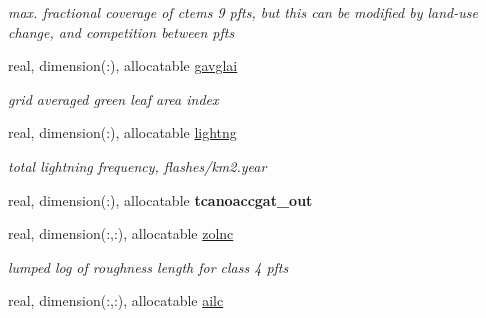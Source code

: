 \begin{DoxyCompactItemize}
\begin{DoxyCompactList}\small\item\em max. fractional coverage of ctem\textquotesingle{}s 9 pfts, but this can be modified by land-\/use change, and competition between pfts \end{DoxyCompactList}\item 
\hypertarget{structctem__statevars_1_1veg__gat_ac1dd257ff4997aaa914c15bde7110ce9}{}real, dimension(\+:), allocatable \hyperlink{structctem__statevars_1_1veg__gat_ac1dd257ff4997aaa914c15bde7110ce9}{gavglai}\label{structctem__statevars_1_1veg__gat_ac1dd257ff4997aaa914c15bde7110ce9}

\begin{DoxyCompactList}\small\item\em grid averaged green leaf area index \end{DoxyCompactList}\item 
\hypertarget{structctem__statevars_1_1veg__gat_a90c2b0eb853f7b917ceb8a61b131946a}{}real, dimension(\+:), allocatable \hyperlink{structctem__statevars_1_1veg__gat_a90c2b0eb853f7b917ceb8a61b131946a}{lightng}\label{structctem__statevars_1_1veg__gat_a90c2b0eb853f7b917ceb8a61b131946a}

\begin{DoxyCompactList}\small\item\em total lightning frequency, flashes/km2.\+year \end{DoxyCompactList}\item 
\hypertarget{structctem__statevars_1_1veg__gat_a9a6c9756ce71c4b085415658104bde10}{}real, dimension(\+:), allocatable {\bfseries tcanoaccgat\+\_\+out}\label{structctem__statevars_1_1veg__gat_a9a6c9756ce71c4b085415658104bde10}

\item 
\hypertarget{structctem__statevars_1_1veg__gat_a9304bfce535adc97f11cf9fa84f079f6}{}real, dimension(\+:,\+:), allocatable \hyperlink{structctem__statevars_1_1veg__gat_a9304bfce535adc97f11cf9fa84f079f6}{zolnc}\label{structctem__statevars_1_1veg__gat_a9304bfce535adc97f11cf9fa84f079f6}

\begin{DoxyCompactList}\small\item\em lumped log of roughness length for class\textquotesingle{} 4 pfts \end{DoxyCompactList}\item 
\hypertarget{structctem__statevars_1_1veg__gat_a5ffd5d1af64c31f2a79746a0a31601f9}{}real, dimension(\+:,\+:), allocatable \hyperlink{structctem__statevars_1_1veg__gat_a5ffd5d1af64c31f2a79746a0a31601f9}{ailc}\label{structctem__statevars_1_1veg__gat_a5ffd5d1af64c31f2a79746a0a31601f9}


\end{DoxyCompactItemize}

